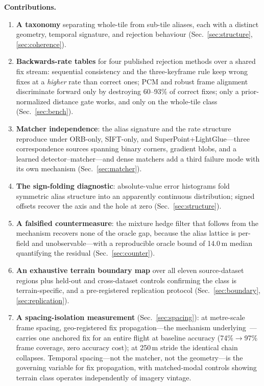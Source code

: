 \documentclass[journal]{IEEEtran}
\begin{document}
\noindent\textbf{Contributions.}
\begin{enumerate}
\item \textbf{A taxonomy} separating whole-tile from sub-tile aliases, each with a distinct geometry, temporal signature, and rejection behaviour (Sec.~\ref{sec:structure}, \ref{sec:coherence}).
\item \textbf{Backwards-rate tables} for four published rejection methods over a shared fix stream: sequential consistency and the three-keyframe rule keep wrong fixes at a \emph{higher} rate than correct ones; PCM and robust frame alignment discriminate forward only by destroying 60--93\% of correct fixes; only a prior-normalized distance gate works, and only on the whole-tile class (Sec.~\ref{sec:bench}).
\item \textbf{Matcher independence}: the alias signature and the rate structure reproduce under ORB-only, SIFT-only, and SuperPoint+LightGlue---three correspondence sources spanning binary corners, gradient blobs, and a learned detector--matcher---and dense matchers add a third failure mode with its own mechanism (Sec.~\ref{sec:matcher}).
\item \textbf{The sign-folding diagnostic}: absolute-value error histograms fold symmetric alias structure into an apparently continuous distribution; signed offsets recover the axis and the hole at zero (Sec.~\ref{sec:structure}).
\item \textbf{A falsified countermeasure}: the mixture hedge filter that follows from the mechanism recovers none of the oracle gap, because the alias lattice is per-field and unobservable---with a reproducible oracle bound of 14.0\,m median quantifying the residual (Sec.~\ref{sec:counter}).
\item \textbf{An exhaustive terrain boundary map} over all eleven source-dataset regions plus held-out and cross-dataset controls confirming the class is terrain-specific, and a pre-registered replication protocol (Sec.~\ref{sec:boundary}, \ref{sec:replication}).
\item \textbf{A spacing-isolation measurement} (Sec.~\ref{sec:spacing}): at metre-scale frame spacing, geo-registered fix propagation---the mechanism underlying~\cite{orthotrack,naviloc}---carries one anchored fix for an entire flight at baseline accuracy (74\%$\to$97\% frame coverage, zero accuracy cost); at 250\,m stride the identical chain collapses. Temporal spacing---not the matcher, not the geometry---is the governing variable for fix propagation, with matched-modal controls showing terrain class operates independently of imagery vintage.
\end{enumerate}
\end{document}
